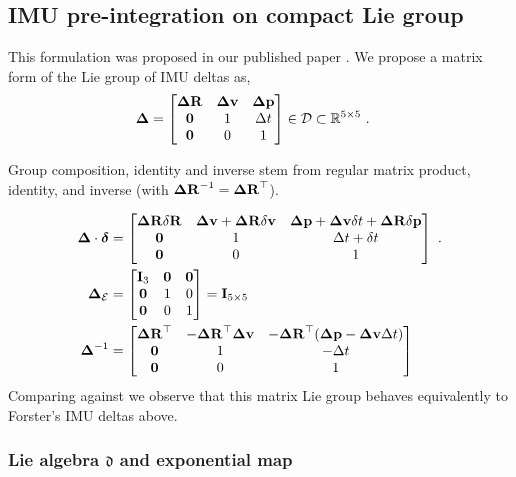 \subsection{IMU pre-integration on compact Lie group}
\label{sec:imu_preint_compact}

This formulation was proposed in our published paper \cite{fourmy2019absolute}.
We propose a matrix form of the Lie group of IMU deltas as,
%
\begin{align}\label{equ:delta_Lie}
    {{\bm \Delta}} &= 
    \begin{bmatrix}
    {\bm \Delta {\bf R}} & {\bm \Delta {\bf v}} & {\bm \Delta {\bf p}} \\
    \bf0 & 1 & \Delta t \\
    \bf0 & 0 & 1
    \end{bmatrix} \in \mathcal{D} \subset {\mathbb R}^{5\times 5}
    ~.
\end{align}

Group composition, identity and inverse stem from regular matrix product, identity, and inverse (with ${\bm \Delta {\bf R}}^{-1}={\bm \Delta {\bf R}}^{\top}$).

\begin{align}
    {{\bm \Delta}}\cdot\bm\delta 
    &= 
    \begin{bmatrix}
    {\bm \Delta {\bf R}}{\delta{\bf R}} & {\bm \Delta {\bf v}} + {\bm \Delta {\bf R}}{\delta{\bf v}} & {\bm \Delta {\bf p}}+{\bm \Delta {\bf v}}\delta t + {\bm \Delta {\bf R}}{\delta{\bf p}} \\
    \bf0 & 1 & \Delta t+\delta t \\
    \bf0 & 0 & 1
    \end{bmatrix}
    ~.
    \label{eq:compact_composition}
    \\
    {{\bm \Delta}}_{\mathcal{E}}&=\begin{bmatrix}
    {\bf I}_3 & \bf0 & \bf0 \\
    \bf0 & 1 & 0 \\
    \bf0 & 0 & 1 
    \end{bmatrix} = {\bf I}_{5\times5}
    \label{equ:identity}
    \\
    {{\bm \Delta}}^{-1} &= \begin{bmatrix}
    {\bm \Delta {\bf R}}^{\top} & -{\bm \Delta {\bf R}}^{\top}{\bm \Delta {\bf v}} & -{\bm \Delta {\bf R}}^{\top}({\bm \Delta {\bf p}}-{\bm \Delta {\bf v}}\Delta t) \\
    \bf0 & 1 & -\Delta t \\
    \bf0 & 0 & 1
    \end{bmatrix} 
    \label{equ:inverse}
\end{align}
%
Comparing against  we observe that this matrix Lie group behaves equivalently to Forster's IMU deltas above.


\subsubsection{Lie algebra \texorpdfstring{$\mathfrak{d}$}{d} and exponential map}

